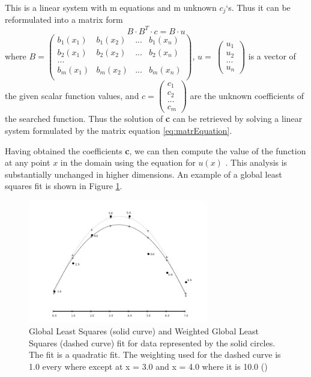This is a linear system with m equations and m unknown $c_j$`s. Thus it can be reformulated into a matrix form
\begin{equation}
 B \cdot B^T \cdot c  = B\cdot u
 \label{eq:matrEquation}
\end{equation}
where $B = 
\begin{pmatrix}
	b_1(x_1) & b_1(x_2) & ... & b_1(x_n)\\
	b_2(x_1) & b_2(x_2) & ... & b_2(x_n)\\
	...\\
	b_m(x_1) & b_m(x_2) & ... & b_m(x_n)\\
\end{pmatrix}$, $u = \
\begin{pmatrix}
	u_1\\
	u_2\\
	...\\
	u_n
\end{pmatrix}$ is a vector of the given scalar function values, and $c = 
\begin{pmatrix}
	c_1\\
	c_2\\
	...\\
	c_m
\end{pmatrix}$ are the unknown coefficients of the searched function. Thus the solution of \textbf{c} can be retrieved by solving a linear system formulated by the matrix equation \ref{eq:matrEquation}.

Having obtained the coefficients \textbf{c}, we can then compute the value of the function at any point $x$ in the domain using the equation for $u(x)$ . This analysis is substantially unchanged in higher dimensions. An example of a global least squares fit is shown in Figure \ref{fig:gls_example}.
\begin{figure}[h]
	\begin{center}
		\includegraphics[width=0.7\textwidth]{figures/GLS.png}
	\end{center}
	\caption{Global Least Squares (solid curve) and Weighted Global Least Squares (dashed curve) fit for data represented by the solid circles. The fit is a quadratic fit. The weighting used for the dashed curve is 1.0 every where except at x = 3.0 and x = 4.0 where it is 10.0 (\cite{MLSIntro})}
	\label{fig:gls_example}
\end{figure}
